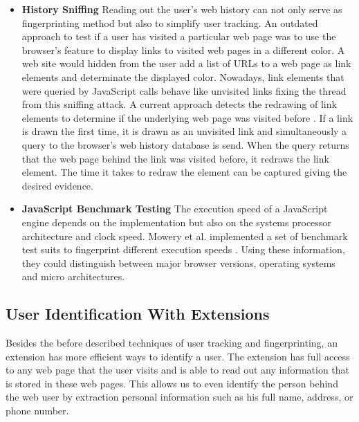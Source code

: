 \begin{itemize}
		\item \textbf{History Sniffing} Reading out the user's web history can not only serve as fingerprinting method but also to simplify user tracking. An outdated approach to test if a user has visited a particular web page was to use the browser's feature to display links to visited web pages in a different color. A web site would hidden from the user add a list of URLs to a web page as link elements and determinate the displayed color. Nowadays, link elements that were queried by JavaScript calls behave like unvisited links fixing the thread from this sniffing attack. A current approach detects the redrawing of link elements to determine if the underlying web page was visited before \cite{paulstone_historysniffing}. If a link is drawn the first time, it is drawn as an unvisited link and simultaneously a query to the browser's web history database is send. When the query returns that the web page behind the link was visited before, it redraws the link element. The time it takes to redraw the element can be captured giving the desired evidence.
		
		\item \textbf{JavaScript Benchmark Testing} The execution speed of a JavaScript engine depends on the implementation but also on the systems processor architecture and clock speed. Mowery et al. implemented a set of benchmark test suits to fingerprint different execution speeds \cite{MBYS11}. Using these information, they could distinguish between major browser versions, operating systems and micro architectures. 
	\end{itemize}	

	

\subsection{User Identification With Extensions}
	
	Besides the before described techniques of user tracking and fingerprinting, an extension has more efficient ways to identify a user. The extension has full access to any web page that the user visits and is able to read out any information that is stored in these web pages. This allows us to even identify the person behind the web user by extraction personal information such as his full name, address, or phone number. 
	
